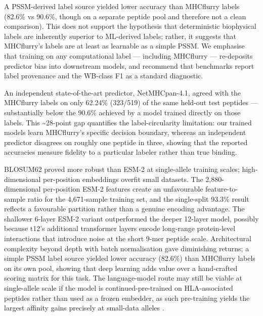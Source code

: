 \documentclass[10pt]{article}
\begin{document}
A PSSM-derived label source yielded lower accuracy than MHCflurry labels
(82.6\% vs 90.6\%, though on a separate peptide pool and therefore not a
clean comparison). This does not support the hypothesis that
deterministic biophysical labels are inherently superior to ML-derived
labels; rather, it suggests that MHCflurry's labels are at least as
learnable as a simple PSSM. We emphasise that training on any
computational label --- including MHCflurry --- re-deposits predictor
bias into downstream models, and recommend that benchmarks report label
provenance and the WB-class F1 as a standard diagnostic.

An independent state-of-the-art predictor, NetMHCpan-4.1, agreed with
the MHCflurry labels on only 62.24\% (323/519) of the same held-out test
peptides --- substantially below the 90.6\% achieved by a model trained
directly on those labels. This \textasciitilde28-point gap quantifies
the label-circularity limitation: our trained models learn MHCflurry's
specific decision boundary, whereas an independent predictor disagrees
on roughly one peptide in three, showing that the reported accuracies
measure fidelity to a particular labeler rather than true binding.

BLOSUM62 proved more robust than ESM-2 at single-allele training scales;
high-dimensional per-position embeddings overfit small datasets. The
2,880-dimensional per-position ESM-2 features create an unfavourable
feature-to-sample ratio for the 4,671-sample training set, and the
single-split 93.3\% result reflects a favourable partition rather than a
genuine encoding advantage. The shallower 6-layer ESM-2 variant
outperformed the deeper 12-layer model, possibly because t12's
additional transformer layers encode long-range protein-level
interactions that introduce noise at the short 9-mer peptide scale.
Architectural complexity beyond depth with batch normalisation gave
diminishing returns; a simple PSSM label source yielded lower accuracy
(82.6\%) than MHCflurry labels on its own pool, showing that deep
learning adds value over a hand-crafted scoring matrix for this task.
The language-model route may still be viable at single-allele scale if
the model is continued-pre-trained on HLA-associated peptides rather
than used as a frozen embedder, as such pre-training yields the largest
affinity gains precisely at small-data alleles \cite{Mares25}.
\end{document}
